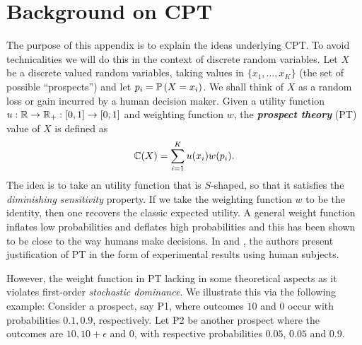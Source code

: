 

\appendix


\section{Background on CPT}
\label{sec:appendix-cpt-intro}
The purpose of this appendix is to explain the ideas underlying CPT. 
To avoid technicalities we will do this in the context of discrete random variables.
Let $X$ be a discrete valued random variables, taking values in $\{x_1,\dots,x_K\}$ (the set of possible ``prospects'') 
and let $p_i = \mathbb{P}\left( X=x_i \right)$.
We shall think of $X$ as a random loss or gain incurred by a human decision maker.
Given a utility function $u:\mathbb{R}\rightarrow \mathbb{R}_+:[0,1] \rightarrow [0,1]$ and weighting function $w$, 
the \textit{\textbf{prospect theory}} (PT) value of $X$ is defined as 
\begin{align}
\mathbb{C}(X) = \sum_{i=1}^K u(x_i) w(p_i).
\label{eq:ptval}
\end{align} 
The idea is to take an utility function that is $S$-shaped, so that it satisfies the \textit{diminishing sensitivity}  property. 
If we take the weighting function $w$ to be the identity, then one recovers the classic expected utility. A general weight function inflates low probabilities and deflates high probabilities and this has been shown to be close to the way humans make decisions. 
In \cite{kahneman1979prospect} and \cite{fennema1997original}, the authors present justification of PT in the form of experimental results  using human subjects.

However, the weight function in PT  lacking in some theoretical aspects as it violates first-order \textit{stochastic dominance}. We illustrate this via the following example: Consider a prospect, say P1, where outcomes $10$ and $0$ occur with probabilities $0.1,  0.9$, respectively. Let P2 be another prospect  where the outcomes are $10, 10+\epsilon$ and $0$, with respective probabilities $0.05$, $0.05$ and $0.9$.

